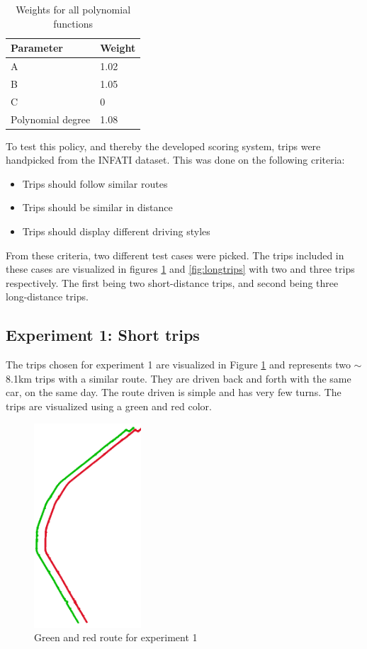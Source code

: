 \begin{table}
    \centering
    \begin{tabular}{ll}
    \textbf{Parameter} & \textbf{Weight} \\ \hline
    A                  & 1.02            \\
    B                  & 1.05            \\
    C                  & 0               \\
    Polynomial degree  & 1.08            \\ \hline
    \end{tabular}
    \caption{Weights for all polynomial functions}
    \label{tab:polyvalues}
\end{table}

To test this policy, and thereby the developed scoring system, trips were handpicked from the INFATI dataset\cite{art:INFATI}. This was done on the following criteria:

\begin{itemize}
  \item Trips should follow similar routes
  \item Trips should be similar in distance
  \item Trips should display different driving styles
\end{itemize}

From these criteria, two different test cases were picked. The trips included in these cases are visualized in figures \ref{fig:shorttrips} and \ref{fig:longtrips} with two and three trips respectively. The first being two short-distance trips, and second being three long-distance trips.

\subsection{Experiment 1: Short trips} \label{subsec:expe1}
The trips chosen for experiment 1 are visualized in Figure \ref{fig:shorttrips} and represents two $\sim$8.1km trips with a similar route. They are driven back and forth with the same car, on the same day. The route driven is simple and has very few turns. The trips are visualized using a green and red color.

\begin{figure}[tb]
    \centering
    \includegraphics[width=40mm]{Pictures/ShortTrips.png}
    \caption{Green and red route for experiment 1}
    \label{fig:shorttrips}
\end{figure}

